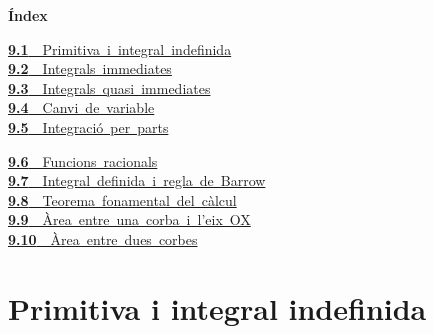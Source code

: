 \documentclass[11pt,a4paper]{article}
\begin{document}
\begin{tcolorbox}[colback=fmsurface,colframe=fmsurface,arc=3mm,left=4mm,right=4mm,top=2mm,bottom=2mm]
\small\textbf{Índex}\par\smallskip
\begin{minipage}[t]{0.49\linewidth}\small \mbox{\hyperlink{sec1}{\textbf{\color{fmgreen}9.1}\ \ Primitiva i integral indefinida}}\\[3pt]
\mbox{\hyperlink{sec2}{\textbf{\color{fmgreen}9.2}\ \ Integrals immediates}}\\[3pt]
\mbox{\hyperlink{sec3}{\textbf{\color{fmgreen}9.3}\ \ Integrals quasi immediates}}\\[3pt]
\mbox{\hyperlink{sec4}{\textbf{\color{fmgreen}9.4}\ \ Canvi de variable}}\\[3pt]
\mbox{\hyperlink{sec5}{\textbf{\color{fmgreen}9.5}\ \ Integració per parts}}\\[3pt]\end{minipage}\hfill\begin{minipage}[t]{0.49\linewidth}\small \mbox{\hyperlink{sec6}{\textbf{\color{fmgreen}9.6}\ \ Funcions racionals}}\\[3pt]
\mbox{\hyperlink{sec7}{\textbf{\color{fmgreen}9.7}\ \ Integral definida i regla de Barrow}}\\[3pt]
\mbox{\hyperlink{sec8}{\textbf{\color{fmgreen}9.8}\ \ Teorema fonamental del càlcul}}\\[3pt]
\mbox{\hyperlink{sec9}{\textbf{\color{fmgreen}9.9}\ \ Àrea entre una corba i l'eix OX}}\\[3pt]
\mbox{\hyperlink{sec10}{\textbf{\color{fmgreen}9.10}\ \ Àrea entre dues corbes}}\\[3pt]\end{minipage}
\end{tcolorbox}

\section{Primitiva i integral indefinida}\hypertarget{sec1}{}
\end{document}
